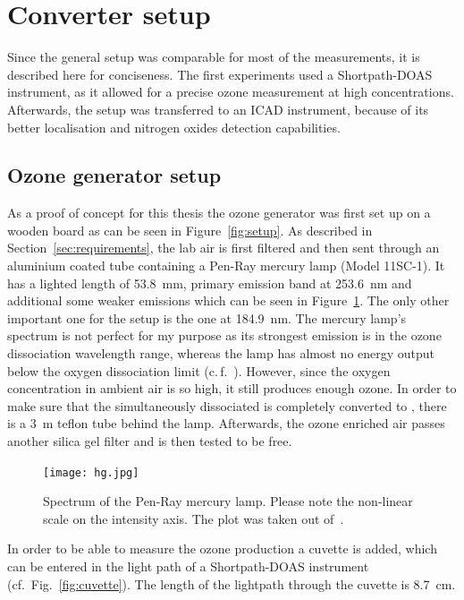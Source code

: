 \section{Converter setup}
\label{sec:setup}

Since the general setup was comparable for most
of the measurements, it is described here for
conciseness. The first experiments used a Shortpath-DOAS instrument, as
it allowed for a precise ozone measurement at high
concentrations. Afterwards, the setup was transferred
to an ICAD instrument, because of its better localisation and
nitrogen oxides detection capabilities.

\subsection{Ozone generator setup}
\label{sec:ozone-setup}

As a proof of concept for this thesis the ozone generator was first
set up on a wooden board as can be seen in Figure~\ref{fig:setup}. As
described in Section~\ref{sec:requirements}, the lab air is first
filtered and then sent through an aluminium coated tube containing a
Pen-Ray mercury lamp (Model 11SC-1). It has a lighted length of
\SI{53.8}{\milli\meter}, primary emission band at
\SI{253.6}{\nano\meter} and additional some weaker emissions which can
be seen in Figure~\ref{fig:hg}. The only other important one for the
setup is the one at \SI{184.9}{\nano\meter}. The mercury lamp's
spectrum is not perfect for my purpose as its strongest emission is in
the ozone dissociation wavelength range, whereas the lamp has almost
no energy output below the oxygen dissociation limit
(c.\,f.~\cite{lamp}). However, since the oxygen concentration in
ambient air is so high, it still produces enough ozone. In order to
make sure that the simultaneously dissociated  is completely
converted to , there is a \SI{3}{\meter} teflon tube behind
the lamp. Afterwards, the ozone enriched air passes another silica gel
filter and is then tested to be  free.
\begin{figure}[htbp]
  \centering
  \texttt{[image: hg.jpg]}
  \caption{Spectrum of the Pen-Ray mercury lamp. Please note the
    non-linear scale on the intensity axis. The plot was taken out
    of~\cite{lamp}.}
  \label{fig:hg}
\end{figure}
In order to be able to measure the ozone production a cuvette is
added, which can be entered in the light path of a Shortpath-DOAS
instrument (cf.\ Fig.~\ref{fig:cuvette}). The length of the lightpath
through the cuvette is \SI{8.7}{\centi\meter}.

